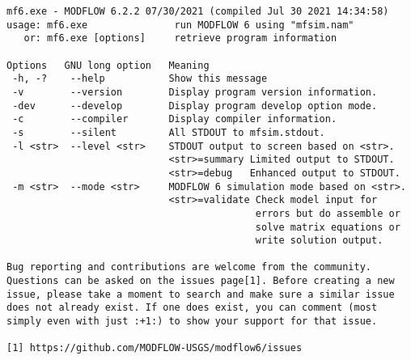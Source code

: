 {\small
\begin{lstlisting}[style=modeloutput]
mf6.exe - MODFLOW 6.2.2 07/30/2021 (compiled Jul 30 2021 14:34:58)
usage: mf6.exe               run MODFLOW 6 using "mfsim.nam"
   or: mf6.exe [options]     retrieve program information

Options   GNU long option   Meaning
 -h, -?    --help           Show this message
 -v        --version        Display program version information.
 -dev      --develop        Display program develop option mode.
 -c        --compiler       Display compiler information.
 -s        --silent         All STDOUT to mfsim.stdout.
 -l <str>  --level <str>    STDOUT output to screen based on <str>.
                            <str>=summary Limited output to STDOUT.
                            <str>=debug   Enhanced output to STDOUT.
 -m <str>  --mode <str>     MODFLOW 6 simulation mode based on <str>.
                            <str>=validate Check model input for
                                           errors but do assemble or
                                           solve matrix equations or
                                           write solution output.

Bug reporting and contributions are welcome from the community.
Questions can be asked on the issues page[1]. Before creating a new
issue, please take a moment to search and make sure a similar issue
does not already exist. If one does exist, you can comment (most
simply even with just :+1:) to show your support for that issue.

[1] https://github.com/MODFLOW-USGS/modflow6/issues


\end{lstlisting}
}
